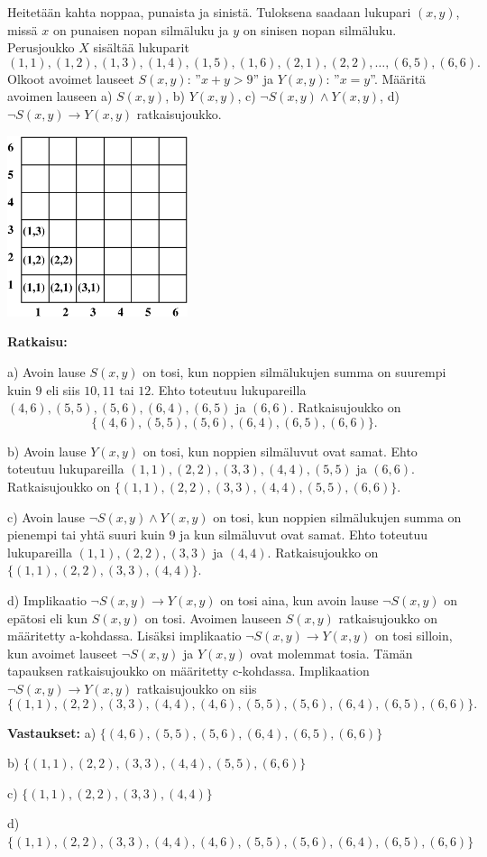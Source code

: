 \begin{esimerkki}
Heitetään kahta noppaa, punaista ja sinistä. Tuloksena saadaan lukupari $(x, y)$, missä $x$ on punaisen nopan silmäluku ja $y$ on sinisen nopan silmäluku. Perusjoukko $X$ sisältää lukuparit
\[
(1, 1), (1, 2), (1, 3), (1, 4), (1, 5), (1, 6), (2, 1), (2, 2),\ldots , (6, 5), (6, 6).
\]
Olkoot avoimet lauseet $S(x, y)$: ''$x + y > 9$'' ja $Y(x, y)$: ''$x = y$''. Määritä avoimen lauseen a) $S(x, y)$, b) $Y(x, y)$, c) $\lnot S(x, y) \land Y(x, y)$, d) $\lnot S(x, y) \to Y(x, y)$ ratkaisujoukko.

\begin{center}
\includegraphics[width=5.3cm]{pictures/6x6}
\end{center}

{\bf Ratkaisu:}

a) Avoin lause $S(x, y)$ on tosi, kun noppien silmälukujen summa on suurempi kuin $9$ eli siis $10, 11$ tai $12$. Ehto toteutuu lukupareilla $(4, 6), (5, 5), (5, 6), (6, 4), (6, 5)$ ja $(6, 6)$. Ratkaisujoukko on
\[
\{(4, 6), (5, 5), (5, 6), (6, 4), (6, 5), (6, 6)\}.
\]

b) Avoin lause $Y(x, y)$ on tosi, kun noppien silmäluvut ovat samat. Ehto toteutuu lukupareilla $(1, 1), (2, 2), (3, 3), (4, 4), (5, 5)$ ja $(6, 6)$. Ratkaisujoukko on $\{(1, 1), (2, 2), (3, 3), (4, 4), (5, 5), (6, 6)\}$.

c) Avoin lause $\lnot S(x, y) \land Y(x, y)$ on tosi, kun noppien silmälukujen summa on pienempi tai yhtä suuri kuin $9$ ja kun silmäluvut ovat samat. Ehto toteutuu lukupareilla $(1, 1), (2, 2), (3, 3)$ ja $(4, 4)$. Ratkaisujoukko on $\{(1, 1), (2, 2), (3, 3), (4, 4)\}$.


d) Implikaatio $\lnot S(x, y) \to Y(x, y)$ on tosi aina, kun avoin lause $\lnot S(x, y)$ on epätosi eli kun $S(x, y)$ on tosi. Avoimen lauseen $S(x, y)$ ratkaisujoukko on määritetty a-kohdassa. Lisäksi implikaatio $\lnot S(x, y) \to Y(x, y)$ on tosi silloin, kun avoimet lauseet $\lnot S(x, y)$ ja $Y(x, y)$ ovat molemmat tosia. Tämän tapauksen ratkaisujoukko on määritetty c-kohdassa. Implikaation $\lnot S(x, y) \to Y(x, y)$ ratkaisujoukko on siis
\[
\{(1, 1), (2, 2), (3, 3), (4, 4), (4, 6), (5, 5), (5, 6), (6, 4), (6, 5), (6, 6)\}.
\]

{\bf Vastaukset:} a) $\{(4, 6), (5, 5), (5, 6), (6, 4), (6, 5), (6, 6)\}$

b) $\{(1, 1), (2, 2), (3, 3), (4, 4), (5, 5), (6, 6)\}$

c) $\{(1, 1), (2, 2), (3, 3), (4, 4)\}$

d) $\{(1, 1), (2, 2), (3, 3), (4, 4), (4, 6), (5, 5), (5, 6), (6, 4), (6, 5), (6, 6)\}$
\end{esimerkki}


